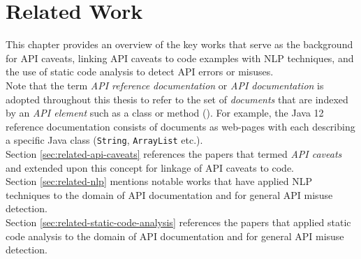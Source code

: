 \chapter{Related Work}
\label{cha:background}
This chapter provides an overview of the key works that serve as the background for API caveats, linking API caveats to code examples with NLP techniques, and the use of static code analysis to detect API errors or misuses. \\
Note that the term \textit{API reference documentation} or \textit{API documentation} is adopted throughout this thesis to refer to the set of \textit{documents} that are indexed by an \textit{API element} such as a class or method (\cite{maalej2013patterns}). For example, the Java 12 reference documentation consists of documents as web-pages with each describing a specific Java class (\lstinline{String}, \lstinline{ArrayList} etc.). \\

Section \ref{sec:related-api-caveats} references the papers that termed \textit{API caveats} and extended upon this concept for linkage of API caveats to code.\\

Section \ref{sec:related-nlp} mentions notable works that have applied NLP techniques to the domain of API documentation and for general API misuse detection.\\

Section \ref{sec:related-static-code-analysis} references the papers that applied static code analysis to the domain of API documentation and for general API misuse detection.\\


